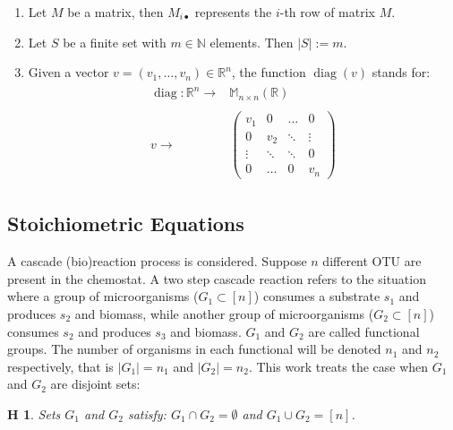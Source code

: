 \documentclass[3p,times]{article}
\newcommand{\N}{\mathbb{N}}
\newcommand{\R}{\mathbb{R}}
\DeclareMathOperator{\diag}{diag}
\newtheorem{hypo}{H}
\begin{document}
\begin{enumerate}
	\item Let $M$ be a matrix, then $M_{i\bullet}$ represents the $i$-th row of matrix $M$.
	\item Let $S$ be a finite set with $m \in \N$ elements. Then $\vert S \vert := m$. 
	\item Given a vector $v=(v_1,\dots, v_n)\in \R^n$, the function $\diag(v)$ stands for:
	\begin{align}
	\begin{array}{rc}
	\diag:\R^n \rightarrow & \mathbb{M}_{n\times n}(\R)\\
	& \\
	v \rightarrow & \begin{pmatrix}
	v_1 & 0 & \dots & 0 \\
	0 & v_2 & \ddots & \vdots\\ 
	\vdots & \ddots & \ddots& 0 \\
	0 & \dots &0 & v_n 
	\end{pmatrix}
	\end{array} \label{diag_operator}
	\end{align}
\end{enumerate}

\subsection{Stoichiometric Equations}
A cascade (bio)reaction process is considered. Suppose $n$ different OTU are present in the chemostat. A two step cascade reaction refers to the situation where a group of microorganisms ($G_1 \subset [n] $) consumes a substrate $s_1$ and produces $s_2$ and biomass, while another group of microorganisms ($G_2\subset [n]$) consumes $s_2$ and produces $s_3$ and biomass. $G_1$ and $G_2$ are called functional groups. The number of organisms in each functional will be denoted $n_1$ and $n_2$ respectively, that is $\vert G_1 \vert = n_1$ and $\vert G_2 \vert = n_2$. This work treats the case when $G_1$ and $G_2$ are disjoint sets:

\begin{hypo}  Sets $G_1$ and $G_2$ satisfy: $G_1 \cap G_2 = \emptyset$ and $G_1 \cup G_2 = [n]$. 
\end{hypo}
\end{document}
